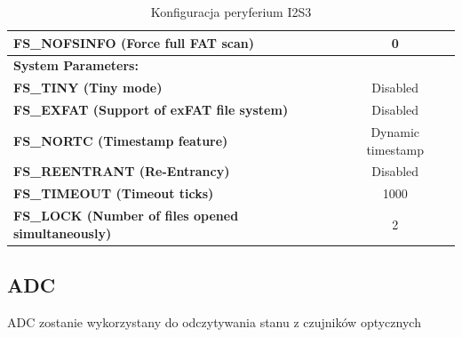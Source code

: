\documentclass[10pt, a4paper]{article}
\begin{document}
\begin{table}[H]
\begin{tabular}{|l|c|}
\hline  \textbf{FS{\_}NOFSINFO (Force full FAT scan)} &  0\\
\hline  \textbf{System Parameters:} \\
\hline  \textbf{FS{\_}TINY (Tiny mode) } & Disabled\\
\hline  \textbf{FS{\_}EXFAT (Support of exFAT file system)} &  Disabled\\
\hline  \textbf{FS{\_}NORTC (Timestamp feature)} &  Dynamic timestamp\\
\hline  \textbf{FS{\_}REENTRANT (Re-Entrancy)} &  Disabled\\
\hline  \textbf{FS{\_}TIMEOUT (Timeout ticks) } & 1000\\
\hline  \textbf{FS{\_}LOCK (Number of files opened simultaneously)} &  2\\

	
	\hline

	\end{tabular}
	\caption{Konfiguracja peryferium I2S3}
	\label{tab:USART}
\end{table}
\newpage
\subsection{ADC}

ADC zostanie wykorzystany do odczytywania stanu z czujników optycznych
\end{document}
